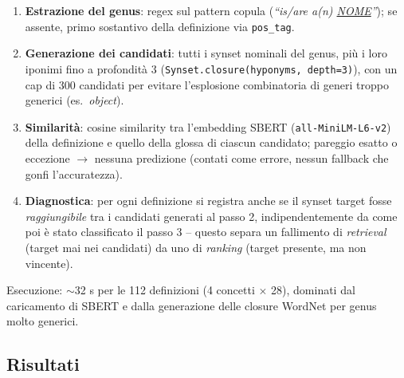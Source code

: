 \documentclass[12pt,a4paper]{article}
\begin{document}
\begin{enumerate}[noitemsep]
  \item \textbf{Estrazione del genus}: regex sul pattern copula (\textit{``is/are a(n) \underline{NOME}''}); se assente, primo sostantivo della definizione via \texttt{pos\_tag}.
  \item \textbf{Generazione dei candidati}: tutti i synset nominali del genus, pi\`u i loro iponimi fino a profondit\`a 3 (\texttt{Synset.closure(hyponyms, depth=3)}), con un cap di 300 candidati per evitare l'esplosione combinatoria di generi troppo generici (es.\ \textit{object}).
  \item \textbf{Similarit\`a}: cosine similarity tra l'embedding SBERT (\texttt{all-MiniLM-L6-v2}) della definizione e quello della glossa di ciascun candidato; pareggio esatto o eccezione $\to$ nessuna predizione (contati come errore, nessun fallback che gonfi l'accuratezza).
  \item \textbf{Diagnostica}: per ogni definizione si registra anche se il synset target fosse \emph{raggiungibile} tra i candidati generati al passo 2, indipendentemente da come poi \`e stato classificato il passo 3 -- questo separa un fallimento di \emph{retrieval} (target mai nei candidati) da uno di \emph{ranking} (target presente, ma non vincente).
\end{enumerate}

Esecuzione: $\sim$32 s per le 112 definizioni (4 concetti $\times$ 28), dominati dal caricamento di SBERT e dalla generazione delle closure WordNet per genus molto generici.

\subsection{Risultati}
\end{document}
